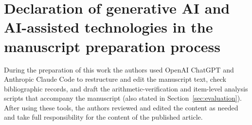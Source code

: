\documentclass[a4paper,fleqn]{cas-dc}
\begin{document}
\section*{Declaration of generative AI and AI-assisted technologies in the manuscript preparation process}
During the preparation of this work the authors used OpenAI ChatGPT and Anthropic Claude Code to restructure and edit the manuscript text, check bibliographic records, and draft the arithmetic-verification and item-level analysis scripts that accompany the manuscript (also stated in Section~\ref{sec:evaluation}). After using these tools, the authors reviewed and edited the content as needed and take full responsibility for the content of the published article.



\end{document}
